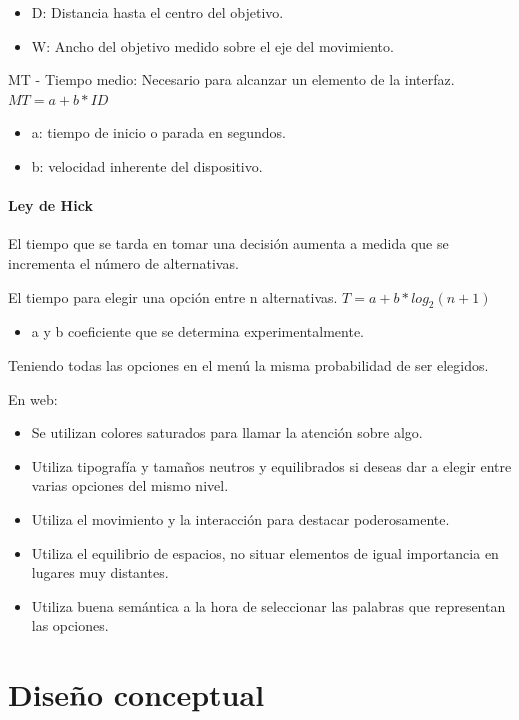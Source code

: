 \documentclass[12pt, twoside, openright]{report} %
\begin{document}
\begin{itemize}
	\item D: Distancia hasta el centro del objetivo.
	\item W: Ancho del objetivo medido sobre el eje del movimiento.
\end{itemize}

MT - Tiempo medio: Necesario para alcanzar un elemento de la
interfaz. \(MT = a+b*ID\)

\begin{itemize}
	\item a: tiempo de inicio o parada en segundos.
	\item b: velocidad inherente del dispositivo.
\end{itemize}


\paragraph{Ley de Hick}
El tiempo que se tarda en tomar una decisión
aumenta a medida que se incrementa el número de alternativas.

El tiempo para elegir una opción entre n alternativas.
\(T=a+b*log_2 (n+1)\)

\begin{itemize}
	\item a y b coeficiente que se determina experimentalmente.
\end{itemize}

Teniendo todas las opciones en el menú la misma probabilidad
de ser elegidos.

En web:

\begin{itemize}
	\item Se utilizan colores saturados para llamar la atención sobre
	      algo.
	\item Utiliza tipografía y tamaños neutros y equilibrados si
	      deseas dar a elegir entre varias opciones del mismo nivel.
	\item Utiliza el movimiento y la interacción para destacar
	      poderosamente.
	\item Utiliza el equilibrio de espacios, no situar elementos de
	      igual importancia en lugares muy distantes.
	\item Utiliza buena semántica a la hora de seleccionar las
	      palabras que representan las opciones.
\end{itemize}




\section{Diseño conceptual}
\end{document}
